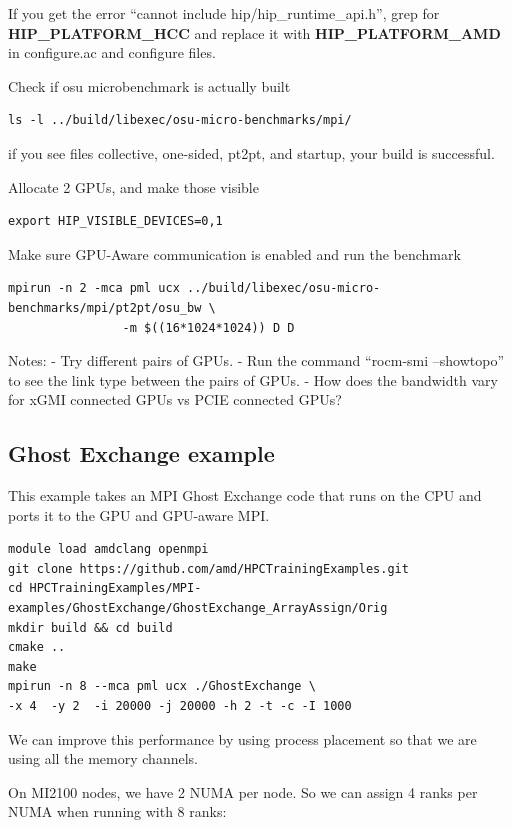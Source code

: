 \documentclass[
]{article}
\begin{document}
If you get the error ``cannot include hip/hip\_runtime\_api.h'', grep
for \textbf{HIP\_PLATFORM\_HCC} and replace it with
\textbf{HIP\_PLATFORM\_AMD} in configure.ac and configure files.

Check if osu microbenchmark is actually built

\begin{verbatim}
ls -l ../build/libexec/osu-micro-benchmarks/mpi/
\end{verbatim}

if you see files collective, one-sided, pt2pt, and startup, your build
is successful.

Allocate 2 GPUs, and make those visible

\begin{verbatim}
export HIP_VISIBLE_DEVICES=0,1
\end{verbatim}

Make sure GPU-Aware communication is enabled and run the benchmark

\begin{verbatim}
mpirun -n 2 -mca pml ucx ../build/libexec/osu-micro-benchmarks/mpi/pt2pt/osu_bw \
                -m $((16*1024*1024)) D D
\end{verbatim}

Notes: - Try different pairs of GPUs. - Run the command ``rocm-smi
--showtopo'' to see the link type between the pairs of GPUs. - How does
the bandwidth vary for xGMI connected GPUs vs PCIE connected GPUs?

\hypertarget{ghost-exchange-example}{%
\subsection{Ghost Exchange example}\label{ghost-exchange-example}}

This example takes an MPI Ghost Exchange code that runs on the CPU and
ports it to the GPU and GPU-aware MPI.

\begin{verbatim}
module load amdclang openmpi
git clone https://github.com/amd/HPCTrainingExamples.git
cd HPCTrainingExamples/MPI-examples/GhostExchange/GhostExchange_ArrayAssign/Orig
mkdir build && cd build
cmake ..
make
mpirun -n 8 --mca pml ucx ./GhostExchange \
-x 4  -y 2  -i 20000 -j 20000 -h 2 -t -c -I 1000
\end{verbatim}

We can improve this performance by using process placement so that we
are using all the memory channels.

On MI2100 nodes, we have 2 NUMA per node. So we can assign 4 ranks per
NUMA when running with 8 ranks:
\end{document}
